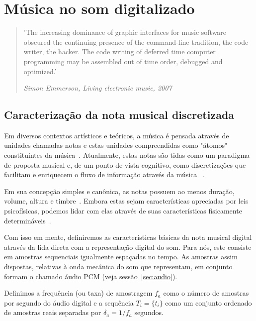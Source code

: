 \chapter{Música no som digitalizado} %
\label{cap:resultados} %
\begin{quotation}
\small
'The increasing dominance of graphic interfaces for music software obscured 
the continuing presence of the command-line tradition, 
the code writer, the hacker. The code writing of deferred time 
computer programming may be assembled out of time order, debugged and optimized.'

\emph{Simon Emmerson, Living electronic music, 2007}
\end{quotation}

\section{Caracterização da nota musical discretizada}
Em diversos contextos artísticos e teóricos, 
a música é pensada através de 
unidades chamadas notas e 
estas unidades compreendidas como "átomos" constituintes da música~\cite{Wisnick, Lovelock, Webern}.
Atualmente, estas notas
são tidas como um paradigma de proposta musical
e, de um ponto de vista cognitivo, como discretizações
que facilitam e enriquecem o fluxo de informação através da música
~\cite{Roederer, Lacerda}.

Em sua concepção
simples e canônica, as notas possuem ao menos duração, volume, altura e timbre~\cite{Lacerda}. Embora estas
sejam características apreciadas por leis psicofísicas, podemos lidar com elas através de suas características
fisicamente determináveis~\cite{Roederer}.

Com isso em mente, definiremos as características básicas da nota musical digital através da lida direta com a representação digital do som.
Para nós, este consiste  em amostras sequenciais
igualmente espaçadas no tempo. As amostras assim dispostas,
relativas à onda mecânica do som que representam,
em conjunto formam o chamado áudio PCM (veja sessão~\ref{sec:audio}).


 Definimos a
frequência (ou taxa) de amostragem $f_a$ como o número de amostras por segundo do áudio digital e
a sequência $T_i=\{t_i\}$ como um conjunto ordenado de amostras reais separadas por $\delta_a=1/f_a$ segundos.


